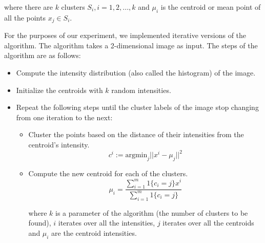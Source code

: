 \documentclass{osuthesis}
\begin{document}
						where there are \begin{math}k\end{math} clusters \begin{math}
							S_{i},i=1,2,...,k \end{math} and \begin{math} \mu_{i} \end{math}
							is the centroid or mean point of all the points \begin{math}x_{j}
								\in S_{i}\end{math}.
								
								For the purposes of our experiment, we implemented iterative versions
								of the algorithm. The algorithm takes a 2-dimensional image as
								input. The steps of the algorithm are as follows:
								
								\begin{itemize}
									\item Compute the intensity distribution (also called the
									histogram) of the image.
									\item Initialize the centroids with $k$ random intensities.
									\item Repeat the following steps until the cluster labels of
									the image stop changing from one iteration to the next:
									\begin{itemize}
										\item Cluster the points based on the distance of their intensities
										from the centroid's intensity.
										\begin{equation}
										c^{i} := \mbox{argmin}_{j}||x^{i} - \mu_{j}||^2
										\end{equation}
										\item Compute the new centroid for each of the clusters.
										\begin{equation}
										\mu_{i} = \frac{\sum\limits_{i=1}^{m} 1\{c_{i} = j\}x^i}{\sum\limits_{i=1}^{m} 1\{c_{i} = j\}}
										\end{equation}
										
										where \begin{math}k\end{math} is a parameter of the algorithm
										(the number of clusters to be
										found), \begin{math}i\end{math} iterates over all the
										intensities, \begin{math}j\end{math} iterates over all the
										centroids and \begin{math}\mu_{i}\end{math} are the
										centroid intensities.
										\end{itemize}
										\end{itemize}
				
\end{document}
